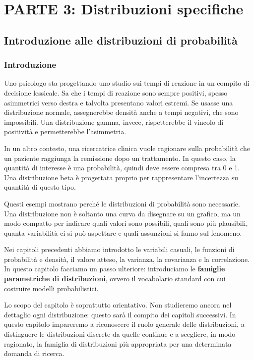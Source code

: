 \documentclass[
  italian,
  letterpaper,
  a4paper,
  11pt,
  open=any]{scrbook}
\theoremstyle{plain}
\theoremstyle{definition}
\theoremstyle{definition}
\theoremstyle{remark}
\begin{document}
\part{PARTE 3: Distribuzioni specifiche}

\chapter{Introduzione alle distribuzioni di
probabilità}\label{sec-prob-intro-distr}

\section*{Introduzione}\label{introduzione-9}


Uno psicologo sta progettando uno studio sui tempi di reazione in un
compito di decisione lessicale. Sa che i tempi di reazione sono sempre
positivi, spesso asimmetrici verso destra e talvolta presentano valori
estremi. Se usasse una distribuzione normale, assegnerebbe densità anche
a tempi negativi, che sono impossibili. Una distribuzione gamma, invece,
rispetterebbe il vincolo di positività e permetterebbe l'asimmetria.

In un altro contesto, una ricercatrice clinica vuole ragionare sulla
probabilità che un paziente raggiunga la remissione dopo un trattamento.
In questo caso, la quantità di interesse è una probabilità, quindi deve
essere compresa tra 0 e 1. Una distribuzione beta è progettata proprio
per rappresentare l'incertezza su quantità di questo tipo.

Questi esempi mostrano perché le distribuzioni di probabilità sono
necessarie. Una distribuzione non è soltanto una curva da disegnare su
un grafico, ma un modo compatto per indicare quali valori sono
possibili, quali sono più plausibili, quanta variabilità ci si può
aspettare e quali assunzioni si fanno sul fenomeno.

Nei capitoli precedenti abbiamo introdotto le variabili casuali, le
funzioni di probabilità e densità, il valore atteso, la varianza, la
covarianza e la correlazione. In questo capitolo facciamo un passo
ulteriore: introduciamo le \textbf{famiglie parametriche di
distribuzioni}, ovvero il vocabolario standard con cui costruire modelli
probabilistici.

Lo scopo del capitolo è soprattutto orientativo. Non studieremo ancora
nel dettaglio ogni distribuzione: questo sarà il compito dei capitoli
successivi. In questo capitolo impareremo a riconoscere il ruolo
generale delle distribuzioni, a distinguere le distribuzioni discrete da
quelle continue e a scegliere, in modo ragionato, la famiglia di
distribuzioni più appropriata per una determinata domanda di ricerca.
\end{document}
